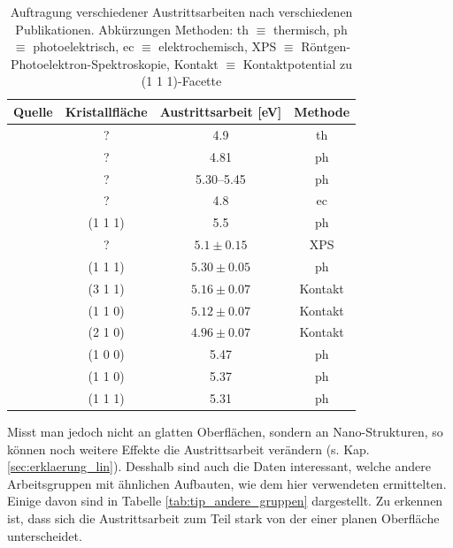 \documentclass[bachelor,       %
               twoside,        %
               BCOR10mm,       %
               english,ngerman, %
               final,          %
               ]{GAUBM}
\begin{document}
\begin{table}[h!]
\centering
\begin{tabular}{|l|c|c|c|}
\hline 
Quelle & Kristallfläche & Austrittsarbeit [\unit{eV}] & Methode \\ 
\hline\hline
\cite{fowler_1931} & ? 			& 4.9 				& th \\\hline
\cite{dubridge_further_1932} & ? 	& 4.81 			& ph \\\hline

\cite{sachtler_work_1966} & ? 	& \numrange{5.30}{5.45} & ph \\\hline

\cite{trasatti_operative_1974} & ? 	& 4.8 		& ec \\\hline
\cite{pescia_spin_1982} & (1 1 1) 	& 5.5 		& ph \\\hline
\cite{koetz_1986} & ? 				& $5.1\pm0.15$ 		& XPS \\\hline
\cite{lecoeur_1990}	& (1 1 1) 		& $5.30\pm0.05$ 	& ph \\
					& (3 1 1) 		& $5.16\pm0.07$ 	& Kontakt \\
					& (1 1 0) 		& $5.12\pm0.07$ 	& Kontakt \\
					& (2 1 0) 		& $4.96\pm0.07$ 	& Kontakt \\\hline
\cite{crc}		&(1 0 0) 			& 5.47 				& ph \\
 				&(1 1 0) 			& 5.37 				& ph \\
				&(1 1 1) 			& 5.31 				& ph \\\hline
\end{tabular} 
\caption{Auftragung verschiedener Austrittsarbeiten nach verschiedenen Publikationen. Abkürzungen Methoden: th $\equiv$ thermisch, ph $\equiv$ photoelektrisch, ec $\equiv$ elektrochemisch, XPS $\equiv$ Röntgen-Photoelektron-Spektroskopie, Kontakt $\equiv$ Kontaktpotential zu (1 1 1)-Facette}
\label{tab:austrittsarbeit}
\end{table}

Misst man jedoch nicht an glatten Oberflächen, sondern an Nano-Strukturen, so können noch weitere Effekte die Austrittsarbeit verändern (s. Kap. \ref{sec:erklaerung_lin}).
Desshalb sind auch die Daten interessant, welche andere Arbeitsgruppen mit ähnlichen Aufbauten, wie dem hier verwendeten ermittelten.
Einige davon sind in Tabelle \ref{tab:tip_andere_gruppen} dargestellt.
Zu erkennen ist, dass sich die Austrittsarbeit zum Teil stark von der einer planen Oberfläche unterscheidet.
\end{document}
